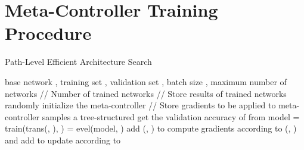\documentclass{article}
\begin{document}
\section{Meta-Controller Training Procedure}
\begin{algorithm}[h]
	\caption{Path-Level Efficient Architecture Search}
	\label{alg:path-level-eas}
	{\small	
		\begin{algorithmic}[1]
			\REQUIRE
			base network , training set , validation set , batch size , maximum number of networks  
			\STATE   // Number of trained networks
            \STATE  // Store results of trained networks
            \STATE randomly initialize the meta-controller 
            \STATE  // Store gradients to be applied to 
            \WHILE{}
            \STATE meta-controller  samples a tree-structured 
            \STATE get the validation accuracy  of  from 
            \ELSE 
            \STATE model = train(trans(, ), )
            \STATE  = evel(model, )
            \STATE add (, ) to 
            \STATE  
            \ENDIF
            \STATE compute gradients according to (, ) and add to 
            \IF{}
            \STATE update  according to 
            \STATE 
            \ENDIF
            \ENDWHILE	
		\end{algorithmic}
	}
\end{algorithm}
\end{document}
